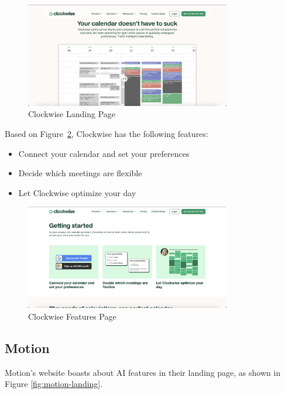 \documentclass[12pt,a4paper,twoside]{report}
\begin{document}
\begin{figure}[!h]
    \centering
    \includegraphics[width=0.8\textwidth]{images/competitors/clockwise-landing.png}
    \caption{Clockwise Landing Page}
    \label{fig:clockwise-landing}
\end{figure}

Based on Figure~\ref{fig:clockwise-features}, Clockwise has the following features:
\begin{itemize}
    \item Connect your calendar and set your preferences
    \item Decide which meetings are flexible
    \item Let Clockwise optimize your day
\end{itemize}

\begin{figure}[!h]
    \centering
    \includegraphics[width=0.8\textwidth]{images/competitors/clockwise-features.png}
    \caption{Clockwise Features Page}
    \label{fig:clockwise-features}
\end{figure}

\subsection{Motion}

Motion's website boasts about AI features in their landing page, as shown in Figure \ref{fig:motion-landing}.
\end{document}
